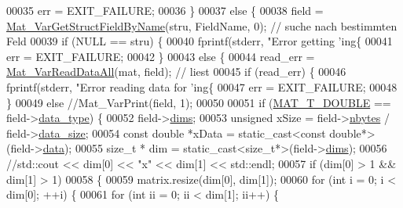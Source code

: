 \begin{DoxyCode}
{{00035         err = EXIT\_FAILURE;
00036     \}
00037     \textcolor{keywordflow}{else} \{
00038         field = \hyperlink{group___m_a_t_ga619d241b49ce97334a38add60562c7be}{Mat\_VarGetStructFieldByName}(stru, FieldName, 0); \textcolor{comment}{// suche nach
       bestimmten Feld}
00039         \textcolor{keywordflow}{if} (NULL == stru) \{
00040             fprintf(stderr, \textcolor{stringliteral}{"Error getting 'ing\{%
00041             err = EXIT\_FAILURE;
00042         \}
00043         \textcolor{keywordflow}{else} \{
00044             read\_err = \hyperlink{group___m_a_t_gaa8060d7c8e5da0aa9ee5f96e5f1eb30a}{Mat\_VarReadDataAll}(mat, field); \textcolor{comment}{// liest}
00045             \textcolor{keywordflow}{if} (read\_err) \{
00046                 fprintf(stderr, \textcolor{stringliteral}{"Error reading data for 'ing\{%
00047                 err = EXIT\_FAILURE;
00048             \}
00049             \textcolor{keywordflow}{else} \textcolor{comment}{//Mat\_VarPrint(field, 1);}
00050 
00051                 \textcolor{keywordflow}{if} (\hyperlink{group___m_a_t_ggacf7b3b879282b7ab3a51190e49bf3453a31e721ecf7e188196f83c32838288797}{MAT\_T\_DOUBLE} == field->\hyperlink{group___m_a_t_ab6aafe9bd77f0f077852593dec438144}{data\_type}) \{
00052                     field->\hyperlink{group___m_a_t_a8e01234e1c862ce3472bb37f5a09b92c}{dims};
00053                     \textcolor{keywordtype}{unsigned} xSize = field->\hyperlink{group___m_a_t_abf1c844540503be2df9bb3db93cfe307}{nbytes} / field->\hyperlink{group___m_a_t_a9ad1c82e2b568da617e12dc73a26e1f9}{data\_size};
00054                     \textcolor{keyword}{const} \textcolor{keywordtype}{double} *xData = \textcolor{keyword}{static\_cast<}\textcolor{keyword}{const }\textcolor{keywordtype}{double}*\textcolor{keyword}{>}(field->\hyperlink{group___m_a_t_a5672978efa230bbdecdf38ede781f7fa}{data});
00055                     \textcolor{keywordtype}{size\_t} * dim = \textcolor{keyword}{static\_cast<}\textcolor{keywordtype}{size\_t}*\textcolor{keyword}{>}(field->\hyperlink{group___m_a_t_a8e01234e1c862ce3472bb37f5a09b92c}{dims});
00056                     \textcolor{comment}{//std::cout << dim[0] << "x" << dim[1] << std::endl;}
00057                     \textcolor{keywordflow}{if} (dim[0] > 1 && dim[1] > 1)
00058                     \{
00059                         matrix.resize(dim[0], dim[1]);
00060                         \textcolor{keywordflow}{for} (\textcolor{keywordtype}{int} i = 0; i < dim[0]; ++i) \{
00061                             \textcolor{keywordflow}{for} (\textcolor{keywordtype}{int} ii = 0; ii < dim[1]; ii++) \{
}}}}
\end{DoxyCode}
